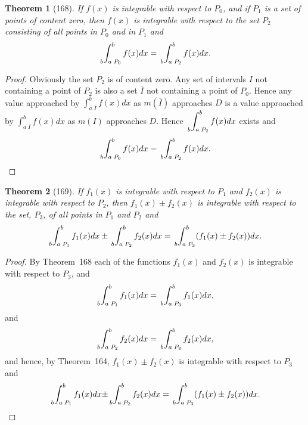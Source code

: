 \documentclass[a4paper,12pt]{book}[2004/02/16]
\providecommand{\colorbox}[2]{#2}
\newcommand{\correction}[2]{\colorbox{corr}{#1}}
\providecommand{\hyperlink}[2]{#2}
\providecommand{\hypertarget}[2]{#2}
\theoremstyle{ilemma}
\theoremstyle{itheorem}
\newtheorem{theorem}{Theorem}
\theoremstyle{iother}
\theoremstyle{icorollary}
\theoremstyle{numcorollary}
\theoremstyle{idefinition}
\begin{document}
\begin{theorem}[168]\hypertarget{thm168}{}
If $f(x)$ is integrable with respect to $P_0$, and if $P_1$ is a set
of points of content zero, then $f(x)$ is integrable with respect to
the set $P_2$ consisting of all points in $P_0$ and in $P_1$ and
\[
  \sideset{_b}{_{a\; P_0}^b}\int f(x)dx
= \sideset{_b}{_{a\; P_2}^b}\int f(x)dx.
\]
\end{theorem}

\begin{proof}
Obviously the set $P_2$ is of content zero. Any set of intervals $I$
not containing a point of $P_2$ is also a set $\overline{I}$ not
containing a point of $P_0$. Hence any value approached by
$\displaystyle\int_{a\; \overline{I}}^b f(x) dx$ as $m(\overline{I})$
approaches $D$ is a value approached by $\displaystyle\int_{a\; I}^b
f(x) dx$ as $m(I)$ approaches $D$. Hence
$\displaystyle\sideset{_b}{_{a\; P_2}^b}\int f(x)dx$ exists and
\[
  \sideset{_b}{_{a\; P_0}^b}\int f(x) dx
= \sideset{_b}{_{a\; P_2}^b}\int f(x) dx.\qedhere
\]
\end{proof}

\begin{theorem}[169]\hypertarget{thm169}{}
If $f_1(x)$ is integrable with respect to $P_1$ and $f_2(x)$ is
integrable with respect to $P_2$, then $f_1(x) \pm f_2(x)$ is
integrable with respect to the set, $P_3$, of all points in $P_1$ and
$P_2$ and
\[
  \sideset{_b}{_{a\; P_1}^b}\int f_\text{\correction{$1$}{}}(x) dx \pm
  \sideset{_b}{_{a\; P_2}^b}\int f_\text{\correction{$2$}{}}(x) dx =
  \sideset{_b}{_{a\; P_3}^b}\int (f_1(x) \pm f_2(x)) dx.
\]
\end{theorem}

\begin{proof}
By Theorem~\hyperlink{thm168}{168} each of the functions $f_1(x)$ and $f_2(x)$ is
integrable with respect to $P_3$, and
\[
  \sideset{_b}{_{a\; P_1}^b}\int f_1(x) dx =
  \sideset{_b}{_{a\; P_3}^b}\int f_1(x) dx,
\]
and
\[
  \sideset{_b}{_{a\; P_2}^b}\int f_2(x) dx =
  \sideset{_b}{_{a\; P_3}^b}\int f_2(x) dx,
\]
and hence, by Theorem~\hyperlink{thm164}{164}, $f_1(x) \pm f_2(x)$ is integrable with
respect to $P_3$ and
\[
  \sideset{_b}{_{a\; P_1}^b}\int f_1(x) dx \text{\correction{$\pm$}{$+$}}
  \sideset{_b}{_{a\; P_2}^b}\int f_\text{\correction{$2$}{}}(x) dx =
  \sideset{_b}{_{a\; P_3}^b}\int (f_\text{\correction{$1$}{}}(x) \pm f_\text{\correction{$2$}{}}(x)) dx.\qedhere
\]
\end{proof}
\end{document}
